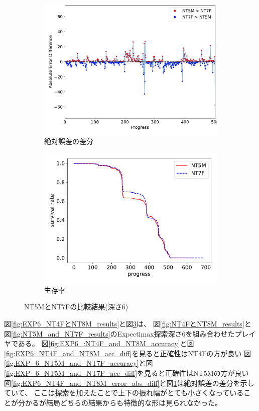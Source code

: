 \begin{figure}[t]
\begin{subfigure}[b]{0.49\linewidth}
    \includegraphics[width=\linewidth]{pdf/compare/EXP6_NT5M_and_NT7F/error_abs_diff_plot.pdf}
    \caption{絶対誤差の差分}
    \label{fig:EXP6_NT5M_and_NT7F_error_abs_diff}
\end{subfigure}
\begin{subfigure}[b]{0.49\linewidth}
    \includegraphics[width=\linewidth]{pdf/compare/EXP6_NT5M_and_NT7F/survival.pdf}
    \caption{生存率}
    \label{fig:EXP6_NT5M_and_NT7F_survival}
\end{subfigure}
\caption{NT5MとNT7Fの比較結果(深さ6)}
\label{fig:EXP6_NT5M_and_NT7F_results}
\end{figure}

図\ref{fig:EXP6_NT4FとNT8M_results}と図\ref{fig:EXP6_NT5M_and_NT7F_results}は、
図\ref{fig:NT4FとNT8M_results}と図\ref{fig:NT5M_and_NT7F_results}のExpectimax探索深さ6を組み合わせたプレイヤである。
図\ref{fig:EXP6_:NT4F_and_NT8M_accuracy}と図\ref{fig:EXP6_NT4F_and_NT8M_acc_diff}を見ると正確性はNT4Fの方が良い
図\ref{fig:EXP_6_NT5M_and_NT7F_accuracy}と図\ref{fig:EXP_6_NT5M_and_NT7F_acc_diff}を見ると正確性はNT5Mの方が良い
図\ref{fig:EXP6_NT4F_and_NT8M_error_abs_diff}と図\ref{fig:EXP6_NT5M_and_NT7F_error_abs_diff}は絶対誤差の差分を示していて、
ここは探索を加えたことで上下の振れ幅がとても小さくなっていることが分かるが結局どちらの結果からも特徴的な形は見られなかった。
